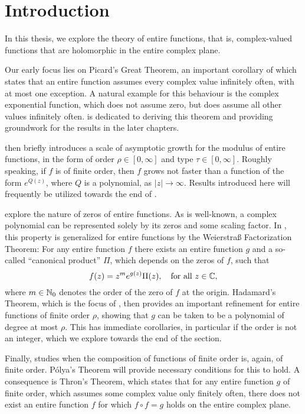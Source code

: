 \chapter{Introduction}
\label{ch:introduction}

In this thesis, we explore the theory of entire functions, that is, complex-valued functions that are holomorphic in the entire complex plane.

Our early focus lies on Picard's Great Theorem, an important corollary of which states that an entire function assumes every complex value infinitely often, with at most one exception. A natural example for this behaviour is the complex exponential function, which does not assume zero, but does assume all other values infinitely often.  is dedicated to deriving this theorem and providing groundwork for the results in the later chapters.

 then briefly introduces a scale of asymptotic growth for the modulus of entire functions, in the form of order $\rho \in [0, \infty]$ and type $\tau \in [0, \infty]$. Roughly speaking, if $f$ is of finite order, then $f$ grows not faster than a function of the form $e^{Q(z)}$, where $Q$ is a polynomial, as $\vert z \vert \to \infty$. Results introduced here will frequently be utilized towards the end of .

 explore the nature of zeros of entire functions. As is well-known, a complex polynomial can be represented solely by its zeros and some scaling factor. In , this property is generalized for entire functions by the Weierstraß Factorization Theorem: For any entire function $f$ there exists an entire function $g$ and a so-called ``canonical product'' $\Pi$, which depends on the zeros of $f$, such that
$$ f(z) = z^m e^{g(z)} \Pi(z), \quad \textrm{for all } z \in \mathbb{C}, $$
where $m \in \mathbb{N}_0$ denotes the order of the zero of $f$ at the origin. Hadamard's Theorem, which is the focus of , then provides an important refinement for entire functions of finite order $\rho $, showing that $g$ can be taken to be a polynomial of degree at most $\rho$. This has immediate corollaries, in particular if the order is not an integer, which we explore towards the end of the section.

Finally,  studies when the composition of functions of finite order is, again, of finite order. Pólya's Theorem will provide necessary conditions for this to hold. A consequence is Thron's Theorem, which states that for any entire function $g$ of finite order, which assumes some complex value only finitely often, there does not exist an entire function $f$ for which $f \circ f = g$ holds on the entire complex plane.

